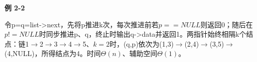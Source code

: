 {\color{ink}\bfseries 例 2-2}\par\vspace{1bp}令p=\allowbreak{}q=\allowbreak{}list->next，先将p推进k次，每次推进前若\(p=\allowbreak{}=\allowbreak{}NULL\)则返回0；随后在\(p!=\allowbreak{}NULL\)时同步推进p、q，终止时输出q->data并返回1。两指针始终相隔k个结点：链1\(\to \)2\(\to \)3\(\to \)4\(\to \)5、\(k=\allowbreak{}2\)时，(q,\allowbreak{}p)依次为(1,\allowbreak{}3)\(\to \)(2,\allowbreak{}4)\(\to \)(3,\allowbreak{}5)\(\to \)(4,\allowbreak{}NULL)，所得结点为4。时间\(\Theta (n)\)、辅助空间\(\Theta (1)\)。
